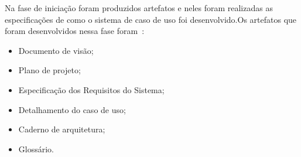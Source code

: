 Na fase de iniciação foram produzidos artefatos e neles foram realizadas as especificações de como o sistema de caso de uso foi desenvolvido.Os artefatos que foram desenvolvidos nessa fase foram~\cite{openup}:
\begin{itemize}
    \item Documento de visão;
    \item Plano de projeto;
    \item Especificação dos Requisitos do Sistema;
    \item Detalhamento do caso de uso;
    \item Caderno de arquitetura;
    \item Glossário.
\end{itemize}
